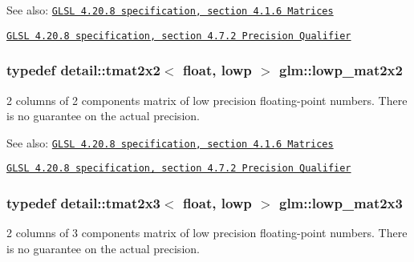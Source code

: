 \begin{Desc}
\item[See also:]\href{http://www.opengl.org/registry/doc/GLSLangSpec.4.20.8.pdf}{\tt GLSL 4.20.8 specification, section 4.1.6 Matrices} 

\href{http://www.opengl.org/registry/doc/GLSLangSpec.4.20.8.pdf}{\tt GLSL 4.20.8 specification, section 4.7.2 Precision Qualifier} \end{Desc}
\hypertarget{group__core__precision_g7d7e123d953978cc17de6882bb10400e}{
\subsubsection[lowp\_\-mat2x2]{\setlength{\rightskip}{0pt plus 5cm}typedef detail::tmat2x2$<$ float, lowp $>$ {\bf glm::lowp\_\-mat2x2}}}
\label{group__core__precision_g7d7e123d953978cc17de6882bb10400e}


2 columns of 2 components matrix of low precision floating-point numbers. There is no guarantee on the actual precision.

\begin{Desc}
\item[See also:]\href{http://www.opengl.org/registry/doc/GLSLangSpec.4.20.8.pdf}{\tt GLSL 4.20.8 specification, section 4.1.6 Matrices} 

\href{http://www.opengl.org/registry/doc/GLSLangSpec.4.20.8.pdf}{\tt GLSL 4.20.8 specification, section 4.7.2 Precision Qualifier} \end{Desc}
\hypertarget{group__core__precision_gef481e637af5103a83ab561d30d28f2a}{
\subsubsection[lowp\_\-mat2x3]{\setlength{\rightskip}{0pt plus 5cm}typedef detail::tmat2x3$<$ float, lowp $>$ {\bf glm::lowp\_\-mat2x3}}}
\label{group__core__precision_gef481e637af5103a83ab561d30d28f2a}


2 columns of 3 components matrix of low precision floating-point numbers. There is no guarantee on the actual precision.

